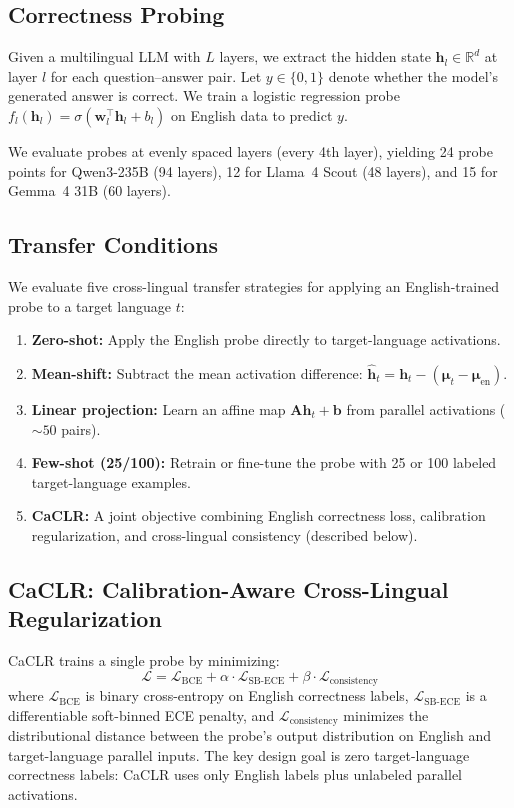 \documentclass[11pt,a4paper]{article}
\begin{document}
\subsection{Correctness Probing}
Given a multilingual LLM with $L$ layers, we extract the hidden state $\mathbf{h}_l \in \mathbb{R}^d$ at layer $l$ for each question--answer pair.
Let $y \in \{0,1\}$ denote whether the model's generated answer is correct.
We train a logistic regression probe $f_l(\mathbf{h}_l) = \sigma(\mathbf{w}_l^\top \mathbf{h}_l + b_l)$ on English data to predict $y$.

We evaluate probes at evenly spaced layers (every 4th layer), yielding 24 probe points for Qwen3-235B (94 layers), 12 for Llama~4 Scout (48 layers), and 15 for Gemma~4 31B (60 layers).

\subsection{Transfer Conditions}

We evaluate five cross-lingual transfer strategies for applying an English-trained probe to a target language $t$:

\begin{enumerate}
\item \textbf{Zero-shot:} Apply the English probe directly to target-language activations.
\item \textbf{Mean-shift:} Subtract the mean activation difference: $\hat{\mathbf{h}}_t = \mathbf{h}_t - (\boldsymbol{\mu}_t - \boldsymbol{\mu}_\text{en})$.
\item \textbf{Linear projection:} Learn an affine map $\mathbf{A}\mathbf{h}_t + \mathbf{b}$ from parallel activations (${\sim}50$ pairs).
\item \textbf{Few-shot (25/100):} Retrain or fine-tune the probe with 25 or 100 labeled target-language examples.
\item \textbf{CaCLR:} A joint objective combining English correctness loss, calibration regularization, and cross-lingual consistency (described below).
\end{enumerate}

\subsection{CaCLR: Calibration-Aware Cross-Lingual Regularization}

CaCLR trains a single probe by minimizing:
\begin{equation}
\mathcal{L} = \mathcal{L}_\text{BCE} + \alpha \cdot \mathcal{L}_\text{SB-ECE} + \beta \cdot \mathcal{L}_\text{consistency}
\end{equation}
where $\mathcal{L}_\text{BCE}$ is binary cross-entropy on English correctness labels, $\mathcal{L}_\text{SB-ECE}$ is a differentiable soft-binned ECE penalty, and $\mathcal{L}_\text{consistency}$ minimizes the distributional distance between the probe's output distribution on English and target-language parallel inputs.
The key design goal is zero target-language correctness labels: CaCLR uses only English labels plus unlabeled parallel activations.
\end{document}
